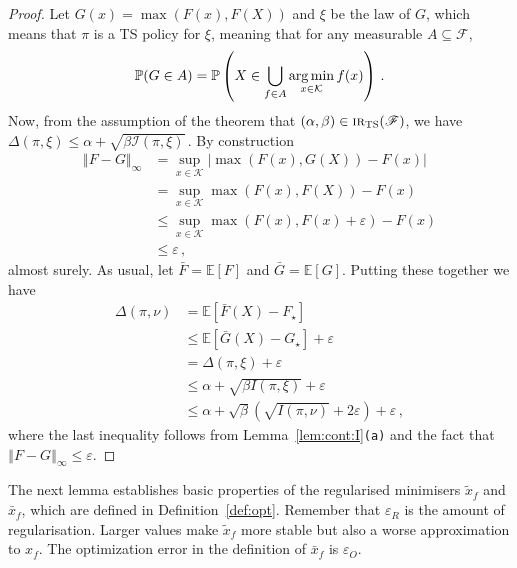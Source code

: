 \documentclass[letter, 12pt]{report}
\newcommand{\epsR}{{\epsilon_R}}
\newcommand{\epsO}{{\epsilon_O}}
\newcommand{\argmin}{\operatornamewithlimits{arg\,min}}
\newcommand{\norm}[1]{\left \Vert  #1 \right \Vert}
\newcommand{\E}{\mathbb E}
\newcommand{\cK}{\mathcal K}
\newcommand{\cF}{\mathcal F}
\newcommand{\sF}{\mathscr F}
\newcommand{\cI}{\mathcal I}
\newcommand{\1}{\mathbf{1}}
\newcommand{\mP}{\mathbb{P}}
\newcommand{\IR}{\operatorname{\textsc{ir}}}
\newcommand{\ts}{\textsc{TS}\xspace}
\renewcommand{\epsilon}{\varepsilon}
\theoremstyle{plain}
\theoremstyle{definition}
\theoremstyle{remark}
\begin{document}
\begin{proof}
    Let $G(x) = \max(F(x), F(X))$ and $\xi$ be the law of $G$, which means that $\pi$ is a \ts{} policy for $\xi$, meaning that for any measurable $A \subseteq \cF$,
    \begin{align*}
        \mP(G \in A) = \mP\left(X \in \bigcup_{f \in A} \argmin_{x \in \cK} f(x)\right)\,.
    \end{align*}
    Now, from the assumption of the theorem that $(\alpha, \beta) \in \IR_\ts(\sF)$, we have
    $\Delta(\pi, \xi) \leq \alpha + \sqrt{\beta \cI(\pi, \xi)}$\,.
    By construction
    \begin{align*}
        \norm{F - G}_\infty
         & =
        \sup_{x \in \cK} |\max(F(x), G(X)) - F(x)|          \\
         & =
        \sup_{x \in \cK} \max(F(x), F(X)) - F(x)            \\
         & \leq
        \sup_{x \in \cK} \max(F(x), F(x) + \epsilon) - F(x) \\
         & \leq \epsilon\,,
    \end{align*}
    almost surely.
    As usual, let $\bar F = \E[F]$ and $\bar G = \E[G]$.
    Putting these together we have
    \begin{align*}
        \Delta(\pi, \nu)
         & = \E[\bar F(X) - F_\star]                                                   \\
         & \leq \E[\bar G(X) - G_\star] + \epsilon                                     \\
         & = \Delta(\pi, \xi) + \epsilon                                               \\
         & \leq \alpha + \sqrt{\beta I(\pi, \xi)} + \epsilon                           \\
         & \leq \alpha + \sqrt{\beta} (\sqrt{I(\pi, \nu)} + 2 \epsilon) + \epsilon \,,
    \end{align*}
    where the last inequality follows from Lemma~\ref{lem:cont:I}\texttt{(a)} and the fact that $\norm{F - G}_\infty \leq \epsilon$.
\end{proof}

The next lemma establishes basic properties of the regularised minimisers $\tilde x_f$ and $\bar x_f$, which are defined
in Definition~\ref{def:opt}.
Remember that $\epsR$ is the amount of regularisation. Larger values make $\tilde x_f$ more stable but also a worse approximation to $x_f$.
The optimization error in the definition of $\bar x_f$ is $\epsO$.
\end{document}
